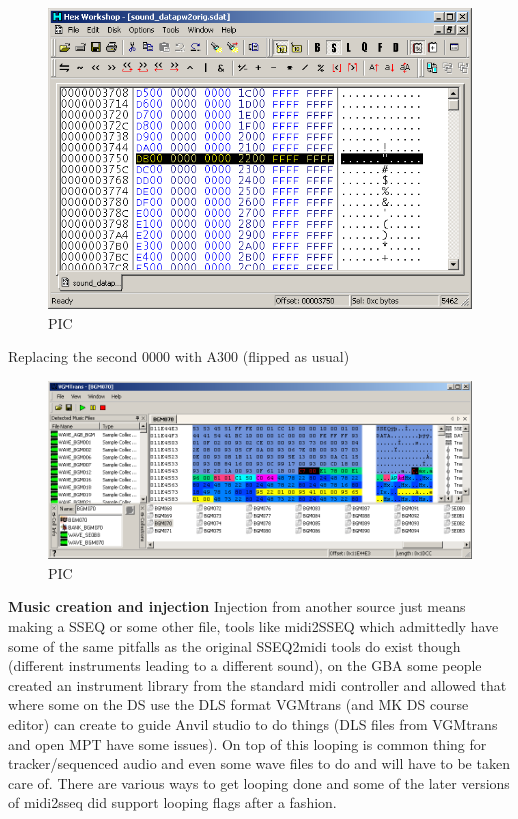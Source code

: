 \documentclass[
]{book}
\begin{document}
\begin{figure}
\centering
\includegraphics{images/150_home_fast6191_romhackingguide_unrenamed_fil___inal_borders_romhackingguidesdatinjection_7.png}
\caption{PIC}
\end{figure}

Replacing the second 0000 with A300 (flipped as usual)

\begin{figure}
\centering
\includegraphics{images/151_home_fast6191_romhackingguide_unrenamed_fil___inal_borders_romhackingguidesdatinjection_8.png}
\caption{PIC}
\end{figure}

\textbf{Music creation and injection} Injection from another source just means making a SSEQ or some other file, tools like midi2SSEQ which admittedly have some of the same pitfalls as the original SSEQ2midi tools do exist though (different instruments leading to a different sound), on the GBA some people created an instrument library from the standard midi controller and allowed that where some on the DS use the DLS format VGMtrans (and MK DS course editor) can create to guide Anvil studio to do things (DLS files from VGMtrans and open MPT have some issues). On top of this looping is common thing for tracker/sequenced audio and even some wave files to do and will have to be taken care of. There are various ways to get looping done and some of the later versions of midi2sseq did support looping flags after a fashion.
\end{document}
